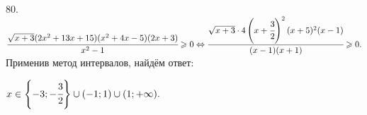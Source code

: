 80. $\cfrac{\sqrt{x+3}(2x^2+13x+15)(x^2+4x-5)(2x+3)}{x^2-1}\geqslant0 \Leftrightarrow \cfrac{\sqrt{x+3}\cdot4\left(x+\cfrac{3}{2}\right)^2(x+5)^2(x-1)}{(x-1)(x+1)}\geqslant0.$ Применив метод интервалов, найдём ответ:
\begin{figure}[ht!]
\end{figure}
$x\in\left\{-3;-\cfrac{3}{2}\right\}\cup(-1;1)\cup(1;+\infty).$\\
